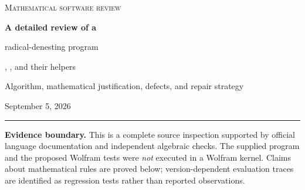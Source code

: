 \documentclass[11pt,letterpaper]{article}
\newcommand{\code}[1]{\texttt{\detokenize{#1}}}
\theoremstyle{definition}
\theoremstyle{remark}
\begin{document}
\begin{titlepage}
\vspace*{0.55in}
{\color{accent}\large\textsc{Mathematical software review}\par}
\vspace{0.25in}
{\fontsize{28}{33}\selectfont\bfseries A detailed review of a\par radical-denesting program\par}
\vspace{0.2in}
{\Large\code{DenestRadicals3}, \code{denest11}, and their helpers\par}
\vspace{0.35in}
{\large Algorithm, mathematical justification, defects, and repair strategy\par}
\vspace{0.25in}
{September 5, 2026\par}
\vspace{0.5in}
\noindent\rule{\textwidth}{0.7pt}
\begin{abstract}
The supplied Wolfram Language program attempts to denest algebraic radical
expressions by combining structural preprocessing with a search over
multipliers. Its central experiment computes the minimal polynomial of a
scaled root and intersects that polynomial with a binomial over an algebraic
coefficient field. A lower-degree greatest common divisor may reveal a simpler
representation. This is a mathematically meaningful strategy, and the
program's denominator-rationalization identity is correct on its natural
domain.

The implementation nevertheless has important correctness defects. It can
lose the branch of the original expression, applies unguarded power identities
in its custom factorizer, uses a heuristic zero test as a certificate, and
contains a comparator that ignores its second argument. Its nominal
multiplier cap is not a cap, invalid multipliers can lead to undefined
arithmetic and unchecked indexing, and loading the file changes the protection
of a system symbol. The article distinguishes these defects from heuristic
incompleteness, representation choices, and merely unusual but valid language
idioms. It supplies proofs, exact counterexamples, a source map, a defensive
single-trial reference component, and a reproducibility package.
\end{abstract}
\vfill
\noindent\textbf{Evidence boundary.} This is a complete source inspection
supported by official language documentation and independent algebraic checks.
The supplied program and the proposed Wolfram tests were \emph{not} executed
in a Wolfram kernel. Claims about mathematical rules are proved below;
version-dependent evaluation traces are identified as regression tests rather
than reported observations.
\end{titlepage}
\tableofcontents
\clearpage
\end{document}
